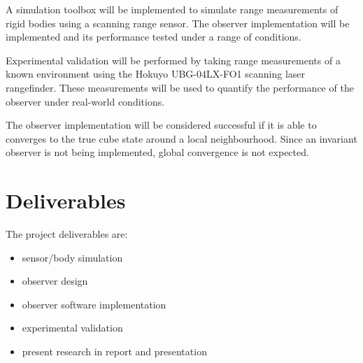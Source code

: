 A simulation toolbox will be implemented to simulate range measurements of rigid bodies using a scanning range sensor. The observer implementation will be implemented and its performance tested under a range of conditions. 

Experimental validation will be performed by taking range measurements of a known environment using the Hokuyo UBG-04LX-FO1 scanning laser rangefinder. These measurements will be used to quantify the performance of the observer under real-world conditions.

The observer implementation will be considered successful if it is able to converges to the true cube state around a local neighbourhood. Since an invariant observer is not being implemented, global convergence is not expected.

\section{Deliverables}
The project deliverables are:
\begin{itemize}
\item sensor/body simulation
\item observer design
\item observer software implementation
\item experimental validation
\item present research in report and presentation
\end{itemize}
